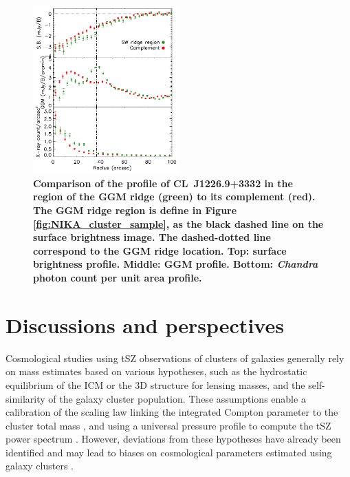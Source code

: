 \documentclass[twocolumn,traditabstract]{aa}
\begin{document}
\begin{figure}[h]
\center
\includegraphics[trim=0cm 0cm 0cm 0cm, clip=true, width=0.5\textwidth]{Figure/profile_CLJ1227.pdf} 
\caption{\footnotesize{\bf Comparison of the profile of \mbox{CL~J1226.9+3332} in the region of the GGM ridge (green) to its complement (red). The GGM ridge region is define in Figure \ref{fig:NIKA_cluster_sample}, as the black dashed line on the surface brightness image. The dashed-dotted line correspond to the GGM ridge location. {\bf Top:} surface brightness profile. {\bf Middle:} GGM profile. {\bf Bottom:} \textit{Chandra} photon count per unit area profile.}}
\label{fig:profile_CLJ1227}
\end{figure}

\section{Discussions and perspectives}\label{sec:discussions}
Cosmological studies using tSZ observations of clusters of galaxies generally rely on mass estimates based on various hypotheses, such as the hydrostatic equilibrium of the ICM or the 3D structure for lensing masses, and the self-similarity of the galaxy cluster population. These assumptions enable a calibration of the scaling law linking the integrated Compton parameter to the cluster total mass \citep[see, e.g,][]{Arnaud2007,Arnaud2010,Planck2013V}, and using a universal pressure profile to compute the tSZ power spectrum \citep[e.g.][]{Komatsu2002}. However, deviations from these hypotheses have already been identified and may lead to biases on cosmological parameters estimated using galaxy clusters \citep[see, e.g.][]{Ichikawa2013,McDonald2014,Planck2014XX,Planck2015XXIV,Planck2016XXII}.
\end{document}
